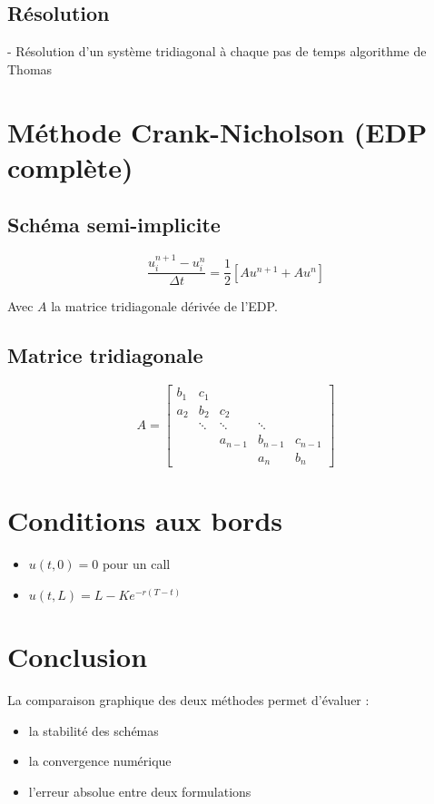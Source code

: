 \documentclass[11pt]{article}
\begin{document}

\subsection*{Résolution}
- Résolution d'un système tridiagonal à chaque pas de temps \rightarrow algorithme de Thomas

\section{Méthode Crank-Nicholson (EDP complète)}
\subsection*{Schéma semi-implicite}

\begin{equation}
    \frac{u_i^{n+1} - u_i^n}{\Delta t} = \frac{1}{2} \left[ A u^{n+1} + A u^n \right]
\end{equation}

Avec $A$ la matrice tridiagonale dérivée de l'EDP.

\subsection*{Matrice tridiagonale}
\begin{equation*}
A = \begin{bmatrix}
    b_1 & c_1 &        &        &        \\
    a_2 & b_2 & c_2    &        &        \\
        & \ddots & \ddots & \ddots &    \\
        &        & a_{n-1} & b_{n-1} & c_{n-1} \\
        &        &        & a_n    & b_n
\end{bmatrix}
\end{equation*}

\section{Conditions aux bords}
\begin{itemize}
    \item $u(t, 0) = 0$ pour un call
    \item $u(t, L) = L - K e^{-r(T - t)}$
\end{itemize}

\section{Conclusion}
La comparaison graphique des deux méthodes permet d'évaluer :
\begin{itemize}
    \item la stabilité des schémas
    \item la convergence numérique
    \item l'erreur absolue entre deux formulations
\end{itemize}
\end{document}
